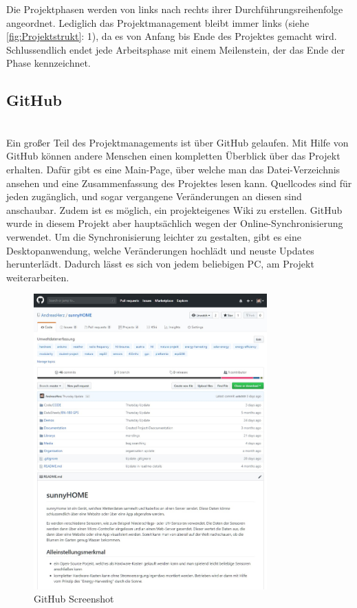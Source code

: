         
        Die Projektphasen werden von links nach rechts ihrer Durchführungsreihenfolge angeordnet. Lediglich das Projektmanagement bleibt immer links (siehe \ref{fig:Projektstrukt}: 1), da es von Anfang bis Ende des Projektes gemacht wird. Schlussendlich endet jede Arbeitsphase mit einem Meilenstein, der das Ende der Phase kennzeichnet. 
        
        \begin{flushright}
            \cite{bib:Strukturpl}
        \end{flushright}
        
        
        
\pagebreak

    \subsection{GitHub}\label{ref:GitHub}
        \ \\ Ein großer Teil des Projektmanagements ist über GitHub gelaufen. Mit Hilfe von GitHub können andere Menschen einen kompletten Überblick über das Projekt erhalten. Dafür gibt es eine Main-Page, über welche man das Datei-Verzeichnis ansehen und eine Zusammenfassung des Projektes lesen kann. Quellcodes sind für jeden zugänglich, und sogar vergangene Veränderungen an diesen sind anschaubar. Zudem ist es möglich, ein projekteigenes Wiki zu erstellen. GitHub wurde in diesem Projekt aber hauptsächlich wegen der Online-Synchronisierung verwendet. Um die Synchronisierung leichter zu gestalten, gibt es eine Desktopanwendung, welche Veränderungen hochlädt und neuste Updates herunterlädt. Dadurch lässt es sich von jedem beliebigen PC, am Projekt weiterarbeiten. 
        
        \begin{figure}[H]
            \centering
            \includegraphics[width=0.8\textwidth]{./media/images/GitHub.jpg}
            \caption{GitHub Screenshot}
            \label{fig:GitHub}
        \end{figure}
        
